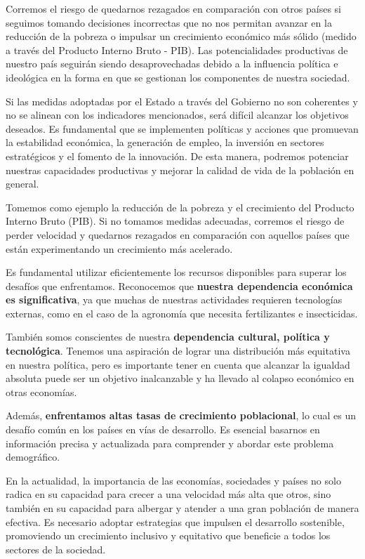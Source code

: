 \documentclass[
  letterpaper,
  DIV=11,
  numbers=noendperiod]{scrartcl}
\begin{document}
Corremos el riesgo de quedarnos rezagados en comparación con otros
países si seguimos tomando decisiones incorrectas que no nos permitan
avanzar en la reducción de la pobreza o impulsar un crecimiento
económico más sólido (medido a través del Producto Interno Bruto - PIB).
Las potencialidades productivas de nuestro país seguirán siendo
desaprovechadas debido a la influencia política e ideológica en la forma
en que se gestionan los componentes de nuestra sociedad.

Si las medidas adoptadas por el Estado a través del Gobierno no son
coherentes y no se alinean con los indicadores mencionados, será difícil
alcanzar los objetivos deseados. Es fundamental que se implementen
políticas y acciones que promuevan la estabilidad económica, la
generación de empleo, la inversión en sectores estratégicos y el fomento
de la innovación. De esta manera, podremos potenciar nuestras
capacidades productivas y mejorar la calidad de vida de la población en
general.

Tomemos como ejemplo la reducción de la pobreza y el crecimiento del
Producto Interno Bruto (PIB). Si no tomamos medidas adecuadas, corremos
el riesgo de perder velocidad y quedarnos rezagados en comparación con
aquellos países que están experimentando un crecimiento más acelerado.

Es fundamental utilizar eficientemente los recursos disponibles para
superar los desafíos que enfrentamos. Reconocemos que \textbf{nuestra
dependencia económica es significativa}, ya que muchas de nuestras
actividades requieren tecnologías externas, como en el caso de la
agronomía que necesita fertilizantes e insecticidas.

También somos conscientes de nuestra \textbf{dependencia cultural,
política y tecnológica}. Tenemos una aspiración de lograr una
distribución más equitativa en nuestra política, pero es importante
tener en cuenta que alcanzar la igualdad absoluta puede ser un objetivo
inalcanzable y ha llevado al colapso económico en otras economías.

Además, \textbf{enfrentamos altas tasas de crecimiento poblacional}, lo
cual es un desafío común en los países en vías de desarrollo. Es
esencial basarnos en información precisa y actualizada para comprender y
abordar este problema demográfico.

En la actualidad, la importancia de las economías, sociedades y países
no solo radica en su capacidad para crecer a una velocidad más alta que
otros, sino también en su capacidad para albergar y atender a una gran
población de manera efectiva. Es necesario adoptar estrategias que
impulsen el desarrollo sostenible, promoviendo un crecimiento inclusivo
y equitativo que beneficie a todos los sectores de la sociedad.
\end{document}
